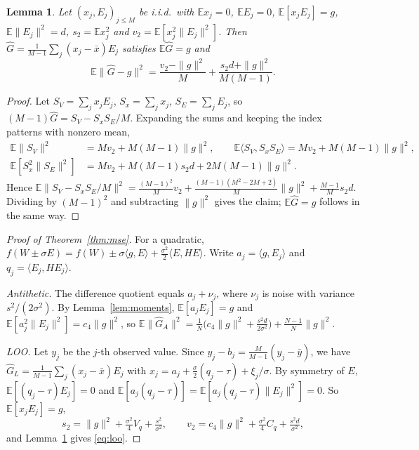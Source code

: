 \documentclass[11pt]{article}
\newtheorem{lemma}[theorem]{Lemma}
\theoremstyle{remark}
\newcommand{\E}{\mathbb{E}}
\newcommand{\ip}[2]{\langle #1,#2\rangle}
\newcommand{\Gh}{\widehat G}
\begin{document}
\begin{lemma}\label{lem:ustat}
Let $(x_j,E_j)_{j\le M}$ be i.i.d.\ with $\E x_j=0$, $\E E_j=0$, $\E[x_jE_j]=g$, $\E\|E_j\|^2=d$, $s_2=\E x_j^2$ and $v_2=\E[x_j^2\|E_j\|^2]$. Then $\Gh=\frac1{M-1}\sum_j(x_j-\bar x)E_j$ satisfies $\E\Gh=g$ and
\[
\E\|\Gh-g\|^2=\frac{v_2-\|g\|^2}{M}+\frac{s_2d+\|g\|^2}{M(M-1)} .
\]
\end{lemma}
\begin{proof}
Let $S_V=\sum_jx_jE_j$, $S_x=\sum_jx_j$, $S_E=\sum_jE_j$, so $(M-1)\Gh=S_V-S_xS_E/M$. Expanding the sums and keeping the index patterns with nonzero mean,
\begin{align*}
\E\|S_V\|^2&=Mv_2+M(M-1)\|g\|^2,\qquad \E\ip{S_V}{S_xS_E}=Mv_2+M(M-1)\|g\|^2,\\
\E[S_x^2\|S_E\|^2]&=Mv_2+M(M-1)s_2d+2M(M-1)\|g\|^2 .
\end{align*}
Hence $\E\|S_V-S_xS_E/M\|^2=\frac{(M-1)^2}{M}v_2+\frac{(M-1)(M^2-2M+2)}{M}\|g\|^2+\frac{M-1}{M}s_2d$. Dividing by $(M-1)^2$ and subtracting $\|g\|^2$ gives the claim; $\E\Gh=g$ follows in the same way.
\end{proof}
\begin{proof}[Proof of Theorem~\ref{thm:mse}]
For a quadratic, $f(W\pm\sigma E)=f(W)\pm\sigma\ip{g}{E}+\frac{\sigma^2}2\ip{E}{HE}$. Write $a_j=\ip{g}{E_j}$ and $q_j=\ip{E_j}{HE_j}$.

\emph{Antithetic.} The difference quotient equals $a_j+\nu_j$, where $\nu_j$ is noise with variance $s^2/(2\sigma^2)$. By Lemma~\ref{lem:moments}, $\E[a_jE_j]=g$ and $\E[a_j^2\|E_j\|^2]=c_4\|g\|^2$, so $\E\|\Gh_A\|^2=\frac1N\big(c_4\|g\|^2+\frac{s^2d}{2\sigma^2}\big)+\frac{N-1}{N}\|g\|^2$.

\emph{LOO.} Let $y_j$ be the $j$-th observed value. Since $y_j-b_j=\frac{M}{M-1}(y_j-\bar y)$, we have $\Gh_L=\frac1{M-1}\sum_j(x_j-\bar x)E_j$ with $x_j=a_j+\frac\sigma2(q_j-\tau)+\xi_j/\sigma$. By symmetry of $E$, $\E[(q_j-\tau)E_j]=0$ and $\E[a_j(q_j-\tau)]=\E[a_j(q_j-\tau)\|E_j\|^2]=0$. So $\E[x_jE_j]=g$,
\[
s_2=\|g\|^2+\tfrac{\sigma^2}4V_q+\tfrac{s^2}{\sigma^2},\qquad v_2=c_4\|g\|^2+\tfrac{\sigma^2}4C_q+\tfrac{s^2d}{\sigma^2},
\]
and Lemma~\ref{lem:ustat} gives \eqref{eq:loo}.
\end{proof}
\end{document}
